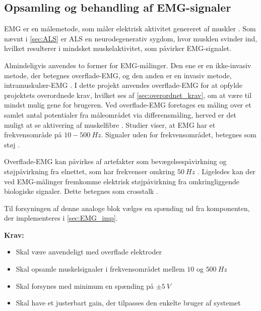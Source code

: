 \subsection{Opsamling og behandling af EMG-signaler} \label{sec:EMG_krav}
EMG er en målemetode, som måler elektrisk aktivitet genereret af muskler \citep{chowdhury2013}. 
Som nævnt i \autoref{sec:ALS} er ALS en neurodegenerativ sygdom, hvor musklen svinder ind, hvilket resulterer i mindsket muskelaktivitet, som påvirker EMG-signalet.

Almindeligvis anvendes to former for EMG-målinger. Den ene er en ikke-invasiv metode, der betegnes overflade-EMG, og den anden er en invasiv metode, intramuskulær-EMG \citep{chowdhury2013, keenan2012}. 
I dette projekt anvendes overflade-EMG for at opfylde projektets overordnede krav, hvilket ses af \autoref{sec:overordnet_krav}, om at være til mindst mulig gene for brugeren. 
Ved overflade-EMG foretages en måling over et samlet antal potentialer fra måleområdet via differensmåling, herved er det muligt at se aktivering af muskelfibre \citep{keenan2012}. 
Studier viser, at EMG har et frekvensområde på $10-500~Hz$. 
Signaler uden for frekvensområdet, betegnes som støj \citep{morre2003, keenan2012}.  

Overflade-EMG kan påvirkes af artefakter som bevægelsespåvirkning og støjpåvirkning fra elnettet, som har frekvenser omkring $50~Hz$ \citep{keenan2012}.
Ligeledes kan der ved EMG-målinger fremkomme elektrisk støjpåvirkning fra omkringliggende biologiske signaler. Dette betegnes som crosstalk \citep{keenan2012}. 


Til forsyningen af denne analoge blok vælges en spænding ud fra komponenten, der implementeres i \autoref{sec:EMG_imp}.

\vspace{3mm}
\textbf{Krav:}
\begin{itemize}
\item Skal være anvendeligt med overflade elektroder
\item Skal opsamle muskelsignaler i frekvensområdet mellem $10$ og $500~Hz$
\item Skal forsynes med minimum en spænding på $\pm5~V$ 
\item Skal have et justerbart gain, der tilpasses den enkelte bruger af systemet
\end{itemize}